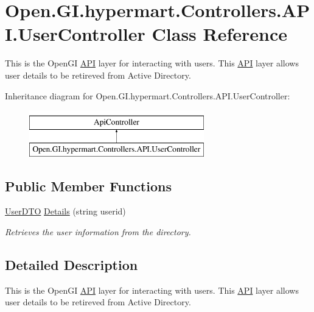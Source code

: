 \hypertarget{class_open_1_1_g_i_1_1hypermart_1_1_controllers_1_1_a_p_i_1_1_user_controller}{}\section{Open.\+G\+I.\+hypermart.\+Controllers.\+A\+P\+I.\+User\+Controller Class Reference}
\label{class_open_1_1_g_i_1_1hypermart_1_1_controllers_1_1_a_p_i_1_1_user_controller}


This is the Open\+GI \hyperlink{namespace_open_1_1_g_i_1_1hypermart_1_1_controllers_1_1_a_p_i}{A\+PI} layer for interacting with users. This \hyperlink{namespace_open_1_1_g_i_1_1hypermart_1_1_controllers_1_1_a_p_i}{A\+PI} layer allows user details to be retireved from Active Directory.  


Inheritance diagram for Open.\+G\+I.\+hypermart.\+Controllers.\+A\+P\+I.\+User\+Controller\+:\begin{figure}[H]
\begin{center}
\leavevmode
\includegraphics[height=2.000000cm]{class_open_1_1_g_i_1_1hypermart_1_1_controllers_1_1_a_p_i_1_1_user_controller}
\end{center}
\end{figure}
\subsection*{Public Member Functions}
\begin{DoxyCompactItemize}
\item 
\hyperlink{class_open_1_1_g_i_1_1hypermart_1_1_data_transformation_objects_1_1_user_d_t_o}{User\+D\+TO} \hyperlink{class_open_1_1_g_i_1_1hypermart_1_1_controllers_1_1_a_p_i_1_1_user_controller_af2896a942d750bcc948228c298221f15}{Details} (string userid)
\begin{DoxyCompactList}\small\item\em Retrieves the user information from the directory. \end{DoxyCompactList}\end{DoxyCompactItemize}


\subsection{Detailed Description}
This is the Open\+GI \hyperlink{namespace_open_1_1_g_i_1_1hypermart_1_1_controllers_1_1_a_p_i}{A\+PI} layer for interacting with users. This \hyperlink{namespace_open_1_1_g_i_1_1hypermart_1_1_controllers_1_1_a_p_i}{A\+PI} layer allows user details to be retireved from Active Directory. 

